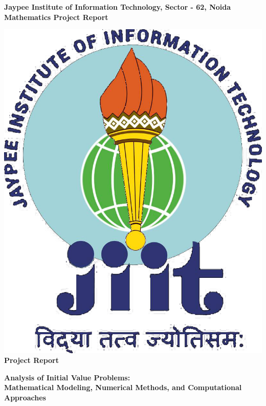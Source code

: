 \documentclass[12pt,a4paper]{article}
\begin{document}
\begin{titlepage}
    \centering
    
    \Huge
    \textbf{Jaypee Institute of Information Technology, Sector - 62, Noida } \\
    \vspace{0.5cm}
    \Large
    \textbf{Mathematics Project Report}\\
    \vspace{0.5cm}

    
    \includegraphics[scale=0.2]{jiit_logo.png}\\
    
    \vspace{0.5cm}
    \Huge
    \textbf{Project Report}\\
    \Large
    
    \textbf{Analysis of Initial Value Problems: \\
    Mathematical Modeling, Numerical Methods, and Computational Approaches}\\
    \vspace{0.5cm}


\end{titlepage}
\end{document}
